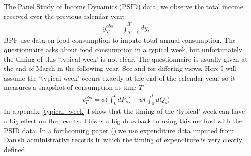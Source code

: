 \documentclass[titlepage]{\econtex}\newcommand{\texname}{BPP_TimeAgg}
\begin{document}
The Panel Study of Income Dynamics (PSID) data, we observe the total income received over the previous calendar year:
\begin{align*}
y^{obs}_T = \int_{T-1}^{T} dy_t
\end{align*}
BPP use data on food consumption to impute total annual consumption. The questionnaire asks about food consumption in a typical week, but unfortunately the timing of this `typical week' is not clear. The questionnaire is usually given at the end of March in the following year. See \cite{altonji_testing_1987} and \cite{hall_sensitivity_1982} for differing views. Here I will assume the `typical week' occurs exactly at the end of the calendar year, so it measures a snapshot of consumption at time $T$
\begin{align*}
c^{obs}_T = \phi \Big( \int_{0}^{t} dP_s  \Big)  +\psi\Big( \int_{0}^{t}dQ_s\Big)
\end{align*}
In appendix \ref{typical_week} I show that the timing of the `typical' week can have a big effect on the results. This is a big drawback to using this method with the PSID data. In a forthcoming paper (\cite{crawley_income_2018}) we use expenditure data imputed from Danish administrative records in which the timing of expenditure is very clearly defined.
\end{document}
